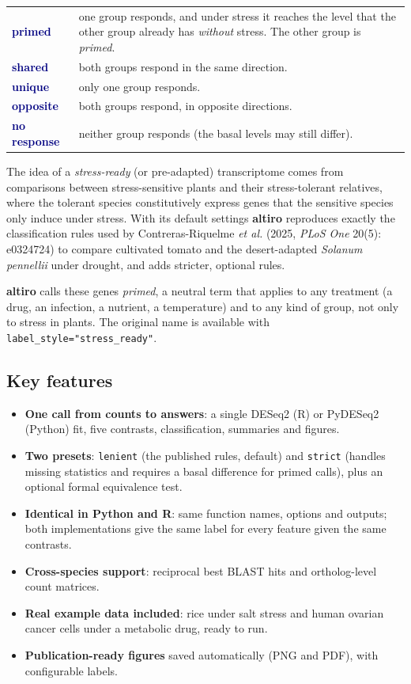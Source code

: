 \documentclass[11pt,a4paper]{article}
\newcommand{\code}[1]{\texttt{\color{navy!85!black}#1}}
\newcommand{\pkg}{\textsf{\bfseries altiro}}
\begin{document}
\begin{center}
\begin{tabularx}{0.94\linewidth}{>{\sffamily\bfseries}l Y}
\toprule
\textcolor{navy}{primed} & one group responds, and under stress it reaches the level that the
other group already has \emph{without} stress. The other group is \emph{primed}.\\
\textcolor{navy}{shared} & both groups respond in the same direction.\\
\textcolor{navy}{unique} & only one group responds.\\
\textcolor{navy}{opposite} & both groups respond, in opposite directions.\\
\textcolor{navy}{no response} & neither group responds (the basal levels may still differ).\\
\bottomrule
\end{tabularx}
\end{center}

The idea of a \emph{stress-ready} (or pre-adapted) transcriptome comes from comparisons between
stress-sensitive plants and their stress-tolerant relatives, where the tolerant species
constitutively express genes that the sensitive species only induce under stress. With its default
settings \pkg{} reproduces exactly the classification rules used by Contreras-Riquelme \emph{et al.}
(2025, \emph{PLoS One} 20(5): e0324724) to compare cultivated tomato and the desert-adapted
\emph{Solanum pennellii} under drought, and adds stricter, optional rules.

\pkg{} calls these genes \emph{primed}, a neutral term that applies to any treatment (a drug,
an infection, a nutrient, a temperature) and to any kind of group, not only to stress in plants.
The original name is available with \code{label\_style="stress\_ready"}.

\subsection{Key features}
\begin{itemize}
  \item \textbf{One call from counts to answers}: a single DESeq2 (R) or PyDESeq2 (Python) fit, five
        contrasts, classification, summaries and figures.
  \item \textbf{Two presets}: \code{lenient} (the published rules, default) and \code{strict} (handles missing
        statistics and requires a basal difference for primed calls), plus an optional formal
        equivalence test.
  \item \textbf{Identical in Python and R}: same function names, options and outputs; both
        implementations give the same label for every feature given the same contrasts.
  \item \textbf{Cross-species support}: reciprocal best BLAST hits and ortholog-level count matrices.
  \item \textbf{Real example data included}: rice under salt stress and human ovarian cancer cells
        under a metabolic drug, ready to run.
  \item \textbf{Publication-ready figures} saved automatically (PNG and PDF), with configurable labels.
\end{itemize}
\end{document}
